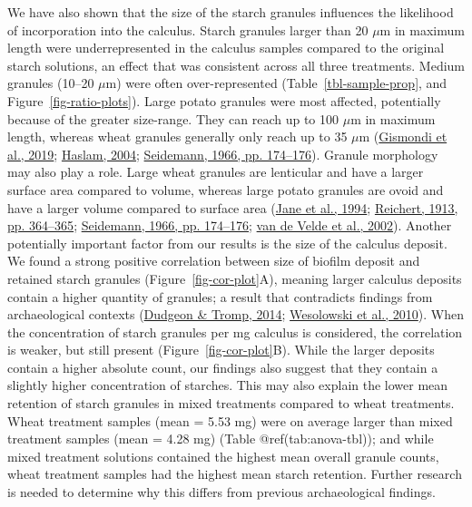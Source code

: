 \documentclass[
  b5paper,
]{book}
\begin{document}
We have also shown that the size of the starch granules influences the
likelihood of incorporation into the calculus. Starch granules larger
than 20 \(\mu\)m in maximum length were underrepresented in the calculus
samples compared to the original starch solutions, an effect that was
consistent across all three treatments. Medium granules (10--20
\(\mu\)m) were often over-represented (Table~\ref{tbl-sample-prop}, and
Figure~\ref{fig-ratio-plots}). Large potato granules were most affected,
potentially because of the greater size-range. They can reach up to 100
\(\mu\)m in maximum length, whereas wheat granules generally only reach
up to 35 \(\mu\)m
(\protect\hyperlink{ref-gismondiStarchGranules2019}{Gismondi et al.,
2019}; \protect\hyperlink{ref-haslamDecompositionStarch2004}{Haslam,
2004}; \protect\hyperlink{ref-seidemannStarchAtlas1966}{Seidemann, 1966,
pp. 174--176}). Granule morphology may also play a role. Large wheat
granules are lenticular and have a larger surface area compared to
volume, whereas large potato granules are ovoid and have a larger volume
compared to surface area
(\protect\hyperlink{ref-janeAnthologyStarch1994}{Jane et al., 1994};
\protect\hyperlink{ref-reichertStarchBible1913b}{Reichert, 1913, pp.
364--365}; \protect\hyperlink{ref-seidemannStarchAtlas1966}{Seidemann,
1966, pp. 174--176};
\protect\hyperlink{ref-vandeveldeStarchMorphology2002}{van de Velde et
al., 2002}). Another potentially important factor from our results is
the size of the calculus deposit. We found a strong positive correlation
between size of biofilm deposit and retained starch granules
(Figure~\ref{fig-cor-plot}A), meaning larger calculus deposits contain a
higher quantity of granules; a result that contradicts findings from
archaeological contexts
(\protect\hyperlink{ref-dudgeonDietGeography2014}{Dudgeon \& Tromp,
2014};
\protect\hyperlink{ref-wesolowskiEvaluatingMicrofossil2010}{Wesolowski
et al., 2010}). When the concentration of starch granules per mg
calculus is considered, the correlation is weaker, but still present
(Figure~\ref{fig-cor-plot}B). While the larger deposits contain a higher
absolute count, our findings also suggest that they contain a slightly
higher concentration of starches. This may also explain the lower mean
retention of starch granules in mixed treatments compared to wheat
treatments. Wheat treatment samples (mean = 5.53 mg) were on average
larger than mixed treatment samples (mean = 4.28 mg) (Table
@ref(tab:anova-tbl)); and while mixed treatment solutions contained the
highest mean overall granule counts, wheat treatment samples had the
highest mean starch retention. Further research is needed to determine
why this differs from previous archaeological findings.
\end{document}
